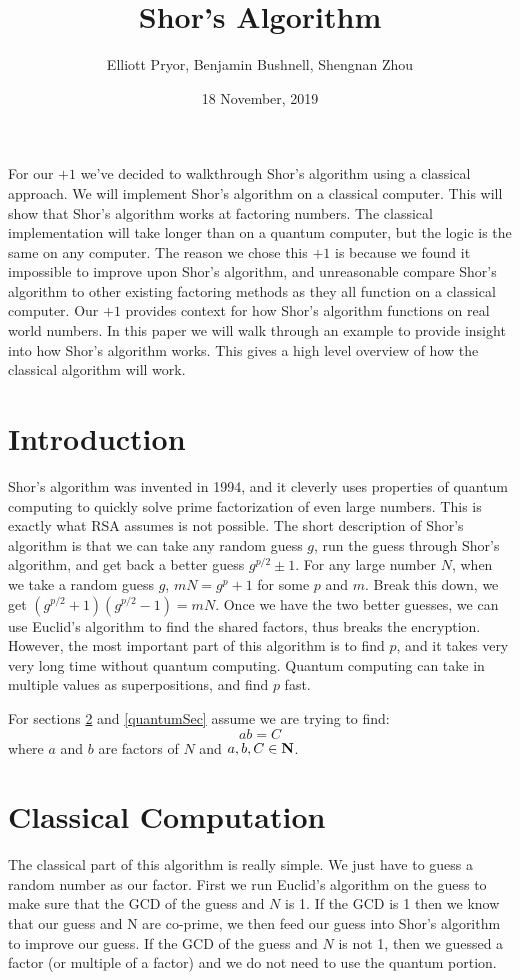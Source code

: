 \documentclass[a4paper]{article}
\title{Shor's Algorithm}
\author{Elliott Pryor, Benjamin Bushnell, Shengnan Zhou}
\date{18 November, 2019}
\begin{document}
\maketitle %

For our $+1$ we've decided to walkthrough Shor's algorithm using a classical approach.
We will implement Shor's algorithm on a classical computer. This will show that Shor's algorithm works at factoring numbers.
The classical implementation will take longer than on a quantum computer, but the logic is the same on any computer.
The reason we chose this $+1$ is because we found it impossible to improve upon Shor's algorithm,
and unreasonable compare Shor's algorithm to other existing factoring methods as they all function on a classical computer.
Our $+1$ provides context for how Shor's algorithm functions on real world numbers.
In this paper we will walk through an example to provide insight into how Shor's algorithm works.
This gives a high level overview of how the classical algorithm will work.

\section{Introduction}
Shor's algorithm was invented in 1994, and it cleverly uses properties of quantum computing to quickly solve prime factorization of even large numbers.
This is exactly what RSA assumes is not possible. The short description of Shor's algorithm is that we can take any random guess $g$,
run the guess through Shor's algorithm, and get back a better guess $g^{p/2} \pm 1$.
For any large number $N$, when we take a random guess $g$, $mN = g^p +1$ for some $p$ and $m$.
Break this down, we get $(g^{p/2}+1)(g^{p/2}-1) = mN$. Once we have the two better guesses,
we can use Euclid's algorithm to find the shared factors, thus breaks the encryption.
However, the most important part of this algorithm is to find $p$, and it takes very very long time without quantum computing.
Quantum computing can take in multiple values as superpositions, and find $p$ fast.

For sections \ref{classicalSec} and \ref{quantumSec} assume we are trying to find:
$$ab = C$$
where $a$ and $b$ are factors of $N$ and $a,b,C \in \mathbf{N}$.

\section{Classical Computation}
\label{classicalSec}
The classical part of this algorithm is really simple. We just have to guess a random number as our factor.
First we run Euclid's algorithm on the guess to make sure that the GCD of the guess and $N$ is 1.
If the GCD is 1 then we know that our guess and N are co-prime, we then feed our guess into Shor's algorithm to improve our guess.
If the GCD of the guess and $N$ is not 1, then we guessed a factor (or multiple of a factor) and we do not need to use the quantum portion.
\end{document}
